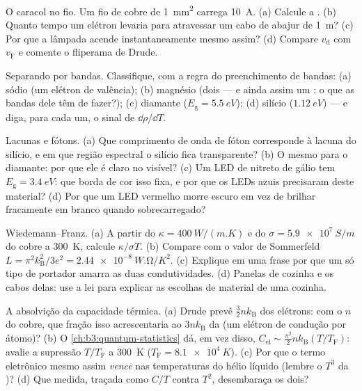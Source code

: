 \begin{exercise}[$\star$]\label{exo:b3:electrons-in-solids:2}
O caracol no fio. Um fio de cobre de \qty{1}{mm^2} carrega
\qty{10}{A}. (a) Calcule a . (b) Quanto tempo um
elétron levaria para atravessar um cabo de abajur de \qty{1}{m}? (c) Por
que a lâmpada acende instantaneamente mesmo assim? (d) Compare
$v_{\text{d}}$ com $v_{\text{F}}$ e comente o fliperama de
Drude.
\end{exercise}

\begin{exercise}[$\star$]\label{exo:b3:electrons-in-solids:3}
Separando por bandas. Classifique, com a regra do preenchimento de
bandas: (a) sódio (um elétron de valência); (b) magnésio (dois --- e
ainda assim um : o que as bandas dele têm de fazer?); (c) diamante
($E_{\text{g}} = \qty{5.5}{eV}$); (d) silício
($\qty{1.12}{eV}$) --- e diga, para cada um, o sinal de
$\dd\rho/\dd T$.
\end{exercise}

\begin{exercise}[$\star$]\label{exo:b3:electrons-in-solids:4}
Lacunas e fótons. (a) Que comprimento de onda de fóton corresponde à
lacuna do silício, e em que região espectral o silício fica
transparente? (b) O mesmo para o diamante: por que ele é claro no
visível? (c) Um LED de nitreto de gálio tem $E_{\text{g}} =
\qty{3.4}{eV}$: que borda de cor isso fixa, e por que os LEDs azuis
precisaram deste material? (d) Por que um LED vermelho morre escuro em
vez de brilhar fracamente em branco quando sobrecarregado?
\end{exercise}

\begin{exercise}[$\star\star$]\label{exo:b3:electrons-in-solids:5}
Wiedemann--Franz. (a) A partir do $\kappa =
\qty{400}{W/(m.K)}$ e do $\sigma = \qty{5.9e7}{S/m}$ do cobre a
\qty{300}{K}, calcule $\kappa/\sigma T$. (b) Compare com o
valor de Sommerfeld $L = \pi^2k_{\text{B}}^2/3e^2 =
\qty{2.44e-8}{W.\ohm/K^2}$. (c) Explique em uma frase por que um só
tipo de portador amarra as duas condutividades. (d) Panelas de cozinha
e os cabos delas: use a lei para explicar as escolhas de material de
uma cozinha.
\end{exercise}

\begin{exercise}[$\star\star$]\label{exo:b3:electrons-in-solids:6}
A absolvição da capacidade térmica. (a) Drude prevê
$\tfrac32nk_{\text{B}}$ dos elétrons: com o $n$ do cobre,
que fração isso acrescentaria ao $3nk_{\text{B}}$ da
 (um elétron de condução por átomo)? (b)
O \cref{ch:b3:quantum-statistics} dá, em vez disso, $C_{\text{el}}
\sim \tfrac{\pi^2}{2}nk_{\text{B}}(T/T_{\text{F}})$: avalie a
supressão $T/T_{\text{F}}$ a \qty{300}{K}
($T_{\text{F}} = \qty{8.1e4}{K}$). (c) Por que o termo eletrônico
mesmo assim \emph{vence} nas temperaturas do hélio líquido
(lembre o $T^3$ da )? (d) Que medida, traçada como
$C/T$ contra $T^2$, desembaraça os dois?
\end{exercise}

